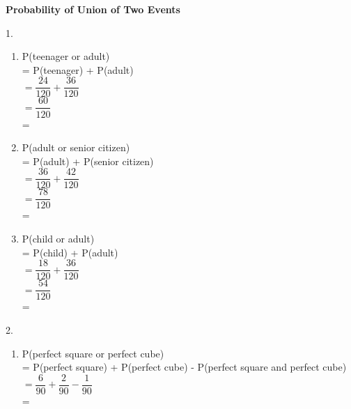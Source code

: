 \begin{center}
\textbf{Probability of Union of Two Events}\\
\end{center}

\vspace*{1ex}

\begin{multicols}{2}

1. 
\begin{enumerate}[label = \alph*. ]
\item P(teenager or adult) \\
= P(teenager) + P(adult) \redcheck \\
$ = \dfrac{24}{120} + \dfrac{36}{120} $ \redcheck \\
$ = \dfrac{60}{120} $ \redcheck \\
= \redcheck 
 
\item P(adult or senior citizen) \\
= P(adult) + P(senior citizen) \redcheck \\
$ = \dfrac{36}{120} + \dfrac{42}{120} $ \redcheck \\
$ = \dfrac{78}{120} $ \redcheck \\
= \redcheck 

\item P(child or adult) \\
= P(child) + P(adult) \redcheck \\
$ = \dfrac{18}{120} + \dfrac{36}{120} $ \redcheck \\
$ = \dfrac{54}{120} $ \redcheck \\
= \redcheck 
\end{enumerate} 

2. 
\begin{enumerate}[label = \alph*. ]
\item P(perfect square or perfect cube) \\
= P(perfect square) + P(perfect cube) - P(perfect square and perfect cube)  \redcheck \\
$ = \dfrac{6}{90} + \dfrac{2}{90} - \dfrac{1}{90} $ \redcheck \\
= \redcheck 


\end{enumerate}
\end{multicols}
